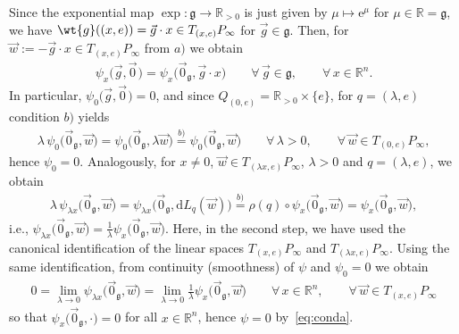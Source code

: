 \documentclass[pdftex]{sigma}
\numberwithin{equation}{section}
\begin{document}
\begin{Example}
\begin{enumerate}
Since the exponential map $\exp\colon \mathfrak{g}\rightarrow \mathbb{R}_{>0}$ is just given by $\mu \mapsto
\mathrm{e}^{\mu}$ for $\mu \in \mathbb{R}=\mathfrak{g}$, we have $\wt{g}((x,e))=\vec{g}\cdot x\in
T_{(x,e)}P_\infty$ for $\vec{g}\in \mathfrak{g}$.
Then, for $\vec{w}:=-\vec{g}\cdot x \in T_{(x,e)}P_\infty$ from $a)$ we obtain
\begin{gather}
\label{eq:conda}
\psi_x\big(\vec{g},\vec{0}\hspace{1pt}\big)=\psi_x\big(\vec{0}_{\mathfrak{g}},\vec{g}\cdot x\big)
\qquad\forall\, \vec{g}\in \mathfrak{g},\qquad\forall\, x\in \mathbb{R}^n.
\end{gather}
In particular, $\psi_0\big(\vec{g},\vec{0}\hspace{1pt}\big)=0$, and since $Q_{(0,e)}=\mathbb{R}_{>0}\times \{e\}$, for
$q=(\lambda,e)$ condition $b)$ yields
\begin{gather*}
\lambda\,\psi_{0}\big(\vec{0}_{\mathfrak{g}},\vec{w}\big)=\psi_{0}\big(\vec{0}_{\mathfrak{g}},\lambda
\vec{w}\big)\stackrel{b)}{=}\psi_{0}\big(\vec{0}_{\mathfrak{g}},\vec{w}\big)
\qquad\forall\, \lambda> 0,\qquad\forall\, \vec{w} \in T_{(0,e)}P_\infty,
\end{gather*}
hence $\psi_0=0$.
Analogously, for $x\neq 0$, $\vec{w} \in T_{(\lambda x,e)}P_\infty$, $\lambda>0$ and $q=(\lambda,e)$, we obtain
\begin{gather*}
\lambda\,\psi_{\lambda x}\big(\vec{0}_{\mathfrak{g}},\vec{w}\big)=\psi_{\lambda
x}\big(\vec{0}_{\mathfrak{g}},\mathrm{d} L_q(\vec{w})\big)\stackrel{b)}{=}\rho(q)\circ
\psi_{x}\big(\vec{0}_{\mathfrak{g}},\vec{w}\big)= \psi_{x}\big(\vec{0}_{\mathfrak{g}},\vec{w}\big),
\end{gather*}
i.e., $\psi_{\lambda x}\big(\vec{0}_{\mathfrak{g}},\vec{w}\big)=\frac{1}{\lambda}
\psi_{x}\big(\vec{0}_{\mathfrak{g}},\vec{w}\big)$.
Here, in the second step, we have used the canonical identif\/ication of the linear spaces $T_{(x,e)}P_\infty$ and
$T_{(\lambda x,e)}P_\infty$.
Using the same identif\/ication, from continuity (smoothness) of $\psi$ and $\psi_{0}=0$ we obtain
\begin{gather*}
0=\lim_{\lambda \rightarrow 0}\psi_{\lambda x}\big(\vec{0}_{\mathfrak{g}},\vec{w}\big)=\lim_{\lambda \rightarrow
0}\frac{1}{\lambda} \psi_{x}\big(\vec{0}_{\mathfrak{g}},\vec{w}\big)
\qquad\forall\, x\in \mathbb{R}^n,\qquad\forall\, \vec{w}\in T_{(x,e)}P_\infty
\end{gather*}
so that $\psi_{x}\big(\vec{0}_{\mathfrak{g}},\cdot\big)=0$ for all $x\in \mathbb{R}^n$, hence $\psi=0$
by~\eqref{eq:conda}.

\end{enumerate}
\end{Example}
\end{document}
